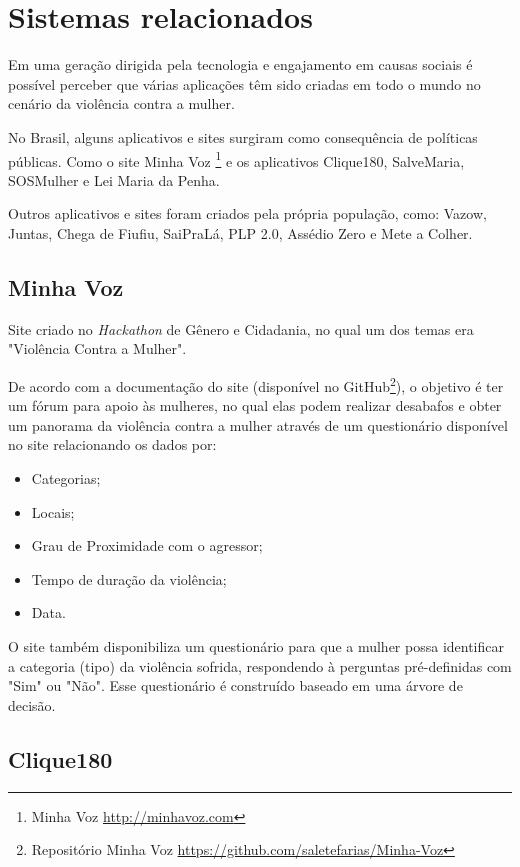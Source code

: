 \chapter{Sistemas relacionados}

Em uma geração dirigida pela tecnologia e engajamento em causas sociais é possível perceber que várias aplicações têm sido criadas em todo o mundo no cenário da violência contra a mulher.

No Brasil, alguns aplicativos e sites surgiram como consequência de políticas públicas. Como o site Minha Voz \footnote{Minha Voz \url{http://minhavoz.com}} e os aplicativos Clique180, SalveMaria, SOSMulher e Lei Maria da Penha.

Outros aplicativos e sites foram criados pela própria população, como: Vazow, Juntas, Chega de Fiufiu, 
SaiPraLá, PLP 2.0, Assédio Zero e Mete a Colher.

\section*{Minha Voz}

Site criado no \textit{Hackathon} de Gênero e Cidadania, no qual
um dos temas era "Violência Contra a Mulher". 

De acordo com a documentação do site (disponível no GitHub\footnote{Repositório Minha Voz \url{https://github.com/saletefarias/Minha-Voz}}), o objetivo é ter um fórum para apoio às mulheres, no qual elas podem
realizar desabafos e obter um panorama da violência contra a mulher através de um questionário
disponível no site relacionando os dados por:

\begin{itemize}
	\item Categorias;
	\item Locais;
	\item Grau de Proximidade com o agressor;
	\item Tempo de duração da violência;
	\item Data.
\end{itemize}

O site também disponibiliza um questionário para que a mulher possa identificar a categoria (tipo) da violência sofrida, respondendo à perguntas pré-definidas com "Sim" ou "Não". Esse questionário é construído baseado em uma árvore de decisão.

\vfill

\section*{Clique180}

